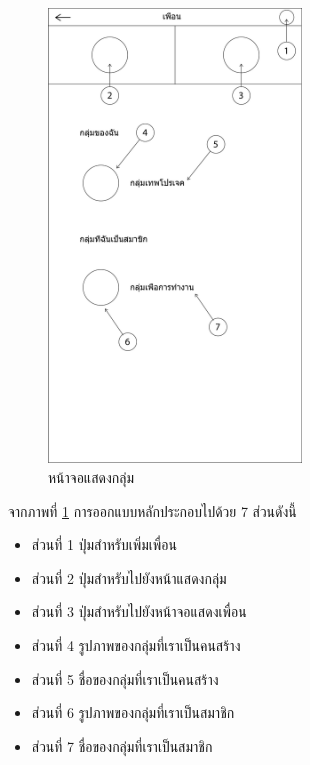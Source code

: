 		\begin{figure}[H]
			\centering
			\includegraphics[width=0.6\textwidth]{Figures/3/UI/group}
			\caption{หน้าจอแสดงกลุ่ม}
			\label{Fig:กลุ่ม}
		\end{figure}
		จากภาพที่ \ref{Fig:กลุ่ม} การออกแบบหลักประกอบไปด้วย 7 ส่วนดังนี้
		\begin{itemize}
			\item ส่วนที่ 1 ปุ่มสำหรับเพิ่มเพื่อน
			\item ส่วนที่ 2 ปุ่มสำหรับไปยังหน้าแสดงกลุ่ม
			\item ส่วนที่ 3 ปุ่มสำหรับไปยังหน้าจอแสดงเพื่อน
			\item ส่วนที่ 4 รูปภาพของกลุ่มที่เราเป็นคนสร้าง
			\item ส่วนที่ 5 ชื่อของกลุ่มที่เราเป็นคนสร้าง
			\item ส่วนที่ 6 รูปภาพของกลุ่มที่เราเป็นสมาชิก
			\item ส่วนที่ 7 ชื่อของกลุ่มที่เราเป็นสมาชิก
		\end{itemize} \\

